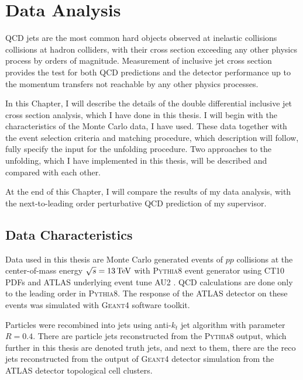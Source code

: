\chapter{Data Analysis}


QCD jets are the most common hard objects observed at inelastic collisions 
collisions at hadron colliders, with their cross section exceeding any other
physics process by orders of magnitude.  Measurement of inclusive jet cross
section provides the test for both QCD predictions and the detector
performance up to the momentum transfers not reachable by any other physics
processes. 

In this Chapter, I will describe the details of the double differential
inclusive jet cross section analysis, which I have done in this thesis.
I will begin with the characteristics of the Monte Carlo data, I have used.
These data together with the event selection criteria and matching procedure,
which description will follow, fully specify the input for the unfolding
procedure. Two approaches to the unfolding, which I have implemented in this
thesis, will be described and compared with each other. 

At the end of this Chapter, I will compare the results of my data analysis, with
the next-to-leading order perturbative QCD prediction of my supervisor. 

\section{Data Characteristics}

Data used in this thesis are Monte Carlo generated events of $pp$ collisions at
the center-of-mass energy $\sqrt{s} = 13\,\text{TeV}$ with \textsc{Pythia8}
\cite{Pythia8} event generator using CT10 PDFs \cite{CT10PDF} and ATLAS underlying event
tune AU2 \cite{AU2}. QCD calculations are done only to the leading order in
\textsc{Pythia8}. The response of the ATLAS detector on these events was
simulated with \textsc{Geant4} \cite{Geant4} software toolkit.

Particles were recombined into jets using anti-$k_t$ jet algorithm with parameter $R=0.4$.
There are particle jets reconstructed from the \textsc{Pythia8} output, which
further in this thesis are denoted truth jets, and next to them, there are the
reco jets reconstructed from the output of \textsc{Geant4} detector
simulation from the ATLAS detector topological cell clusters. 

